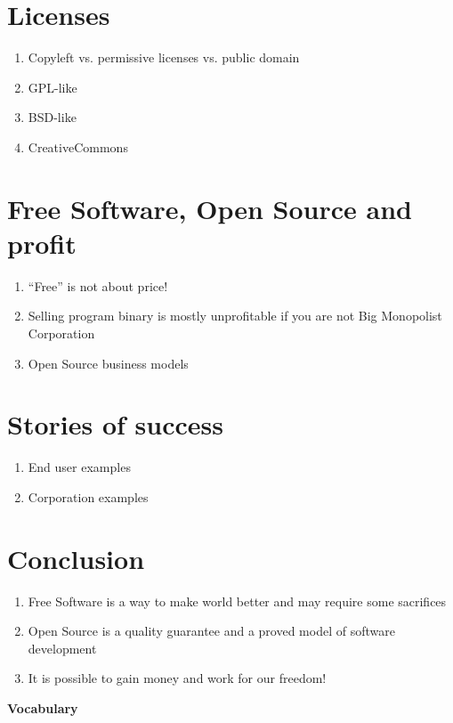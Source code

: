 \documentclass[10pt,a4paper]{article}
\newcommand{\bee}{\begin{enumerate}\setlength{\itemsep}{-0.65mm}}
\newcommand{\ene}{\end{enumerate}}
\begin{document}
\begin{multicols}{2}
\section{Licenses}
\bee
  \item Copyleft vs. permissive licenses vs. public domain
  \item GPL-like
  \item BSD-like
  \item CreativeCommons
\ene

\section{Free Software, Open Source and profit}
\bee
  \item ``Free'' is not about price!
  \item Selling program binary is mostly unprofitable if you are not Big Monopolist Corporation
  \item Open Source business models
\ene

\section{Stories of success}
\bee
  \item End user examples
  \item Corporation examples
\ene

\section*{Conclusion}
\bee
  \item Free Software is a way to make world better and may require some sacrifices
  \item Open Source is a quality guarantee and a proved model of software development
  \item It is possible to gain money and work for our freedom!
\ene

\end{multicols}

\begin{center}
{\LARGE \bfseries Vocabulary}
\end{center}
\end{document}
